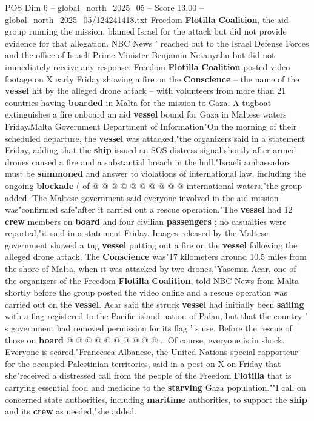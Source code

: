 \begin{textsample}{POS Dim 6 – global\_north\_2025\_05 – Score 13.00 – global\_north\_2025\_05/124241418.txt}  \label{ex:f6_pos_044}
Freedom \textbf{Flotilla} \textbf{Coalition}, the aid group running the mission, blamed Israel for the attack but did not provide evidence for that allegation.
NBC News ' reached out to the Israel Defense Forces and the office of Israeli Prime Minister Benjamin Netanyahu but did not immediately receive any response.
Freedom \textbf{Flotilla} \textbf{Coalition} posted video footage on X early Friday showing a fire on the \textbf{Conscience} -- the name of the \textbf{vessel} hit by the alleged drone attack -- with volunteers from more than 21 countries having \textbf{boarded} in Malta for the mission to Gaza.
A tugboat extinguishes a fire onboard an aid \textbf{vessel} bound for Gaza in Maltese waters Friday.Malta Government Department of Information"On the morning of their scheduled departure, the \textbf{vessel} was attacked,"the organizers said in a statement Friday, adding that the \textbf{ship} issued an SOS distress signal shortly after armed drones caused a fire and a substantial breach in the hull."Israeli ambassadors must be \textbf{summoned} and answer to violations of international law, including the ongoing \textbf{blockade} ( of @ @ @ @ @ @ @ @ @ @ international waters,"the group added.
The Maltese government said everyone involved in the aid mission was"confirmed safe"after it carried out a rescue operation."The \textbf{vessel} had 12 \textbf{crew} members on \textbf{board} and four civilian \textbf{passengers} ; no casualties were reported,"it said in a statement Friday.
Images released by the Maltese government showed a tug \textbf{vessel} putting out a fire on the \textbf{vessel} following the alleged drone attack.
The \textbf{Conscience} was"17 kilometers around 10.5 miles from the shore of Malta, when it was attacked by two drones,"Yasemin Acar, one of the organizers of the Freedom \textbf{Flotilla} \textbf{Coalition}, told NBC News from Malta shortly before the group posted the video online and a rescue operation was carried out on the \textbf{vessel}.
Acar said the struck \textbf{vessel} had initially been \textbf{sailing} with a flag registered to the Pacific island nation of Palau, but that the country ' s government had removed permission for its flag ' s use.
Before the rescue of those on \textbf{board} @ @ @ @ @ @ @ @ @ @...
Of course, everyone is in shock.
Everyone is scared."Francesca Albanese, the United Nations special rapporteur for the occupied Palestinian territories, said in a post on X on Friday that she"received a distressed call from the people of the Freedom \textbf{Flotilla} that is carrying essential food and medicine to the \textbf{starving} Gaza population.""I call on concerned state authorities, including \textbf{maritime} authorities, to support the \textbf{ship} and its \textbf{crew} as needed,"she added.

\end{textsample}
